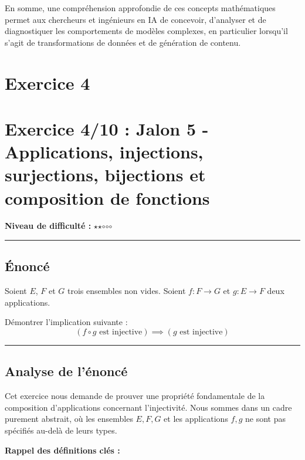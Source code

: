 \documentclass[12pt,a4paper]{report}
\begin{document}
En somme, une compréhension approfondie de ces concepts mathématiques
permet aux chercheurs et ingénieurs en IA de concevoir, d'analyser et de
diagnostiquer les comportements de modèles complexes, en particulier
lorsqu'il s'agit de transformations de données et de génération de
contenu.
\newpage
\section{Exercice 4}
\section{Exercice 4/10 : Jalon 5 - Applications, injections,
surjections, bijections et composition de
fonctions}\label{exercice-410-jalon-5---applications-injections-surjections-bijections-et-composition-de-fonctions}

\textbf{Niveau de difficulté :} \(\star\)\(\star\)$\circ$$\circ$$\circ$

\begin{center}\rule{0.5\linewidth}{0.5pt}\end{center}

\subsection{Énoncé}\label{uxe9noncuxe9}

Soient \(E\), \(F\) et \(G\) trois ensembles non vides. Soient
\(f: F \to G\) et \(g: E \to F\) deux applications.

Démontrer l'implication suivante :
\[ (f \circ g \text{ est injective}) \implies (g \text{ est injective}) \]

\begin{center}\rule{0.5\linewidth}{0.5pt}\end{center}

\subsection{Analyse de l'énoncé}\label{analyse-de-luxe9noncuxe9}

Cet exercice nous demande de prouver une propriété fondamentale de la
composition d'applications concernant l'injectivité. Nous sommes dans un
cadre purement abstrait, où les ensembles \(E, F, G\) et les
applications \(f, g\) ne sont pas spécifiés au-delà de leurs types.

\textbf{Rappel des définitions clés :}
\end{document}
